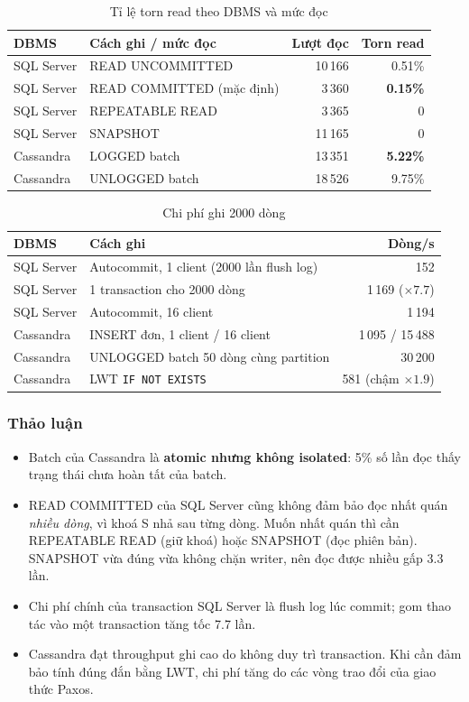 \begin{table}[H]
\centering
\caption{Tỉ lệ torn read theo DBMS và mức đọc}
\label{tab:torn-read}
\begin{tabular}{|l|l|r|r|}
\hline
\textbf{DBMS} & \textbf{Cách ghi / mức đọc} & \textbf{Lượt đọc} & \textbf{Torn read} \\ \hline
SQL Server & READ UNCOMMITTED & 10\,166 & 0.51\% \\ \hline
SQL Server & READ COMMITTED (mặc định) & 3\,360 & \textbf{0.15\%} \\ \hline
SQL Server & REPEATABLE READ & 3\,365 & 0 \\ \hline
SQL Server & SNAPSHOT & 11\,165 & 0 \\ \hline
Cassandra & LOGGED batch & 13\,351 & \textbf{5.22\%} \\ \hline
Cassandra & UNLOGGED batch & 18\,526 & 9.75\% \\ \hline
\end{tabular}
\end{table}

\begin{table}[H]
\centering
\caption{Chi phí ghi 2000 dòng}
\label{tab:tx-cost}
\begin{tabular}{|l|l|r|}
\hline
\textbf{DBMS} & \textbf{Cách ghi} & \textbf{Dòng/s} \\ \hline
SQL Server & Autocommit, 1 client (2000 lần flush log) & 152 \\ \hline
SQL Server & 1 transaction cho 2000 dòng & 1\,169 ($\times 7.7$) \\ \hline
SQL Server & Autocommit, 16 client & 1\,194 \\ \hline
Cassandra & INSERT đơn, 1 client / 16 client & 1\,095 / 15\,488 \\ \hline
Cassandra & UNLOGGED batch 50 dòng cùng partition & 30\,200 \\ \hline
Cassandra & LWT \texttt{IF NOT EXISTS} & 581 (chậm $\times 1.9$) \\ \hline
\end{tabular}
\end{table}

\subsubsection{Thảo luận}
\begin{itemize}
    \item Batch của Cassandra là \textbf{atomic nhưng không isolated}: 5\% số lần đọc thấy trạng thái chưa hoàn tất của batch.
    \item READ COMMITTED của SQL Server cũng không đảm bảo đọc nhất quán \textit{nhiều dòng}, vì khoá S nhả sau từng dòng. Muốn nhất quán thì cần REPEATABLE READ (giữ khoá) hoặc SNAPSHOT (đọc phiên bản). SNAPSHOT vừa đúng vừa không chặn writer, nên đọc được nhiều gấp 3.3 lần.
    \item Chi phí chính của transaction SQL Server là flush log lúc commit; gom thao tác vào một transaction tăng tốc 7.7 lần.
    \item Cassandra đạt throughput ghi cao do không duy trì transaction. Khi cần đảm bảo tính đúng đắn bằng LWT, chi phí tăng do các vòng trao đổi của giao thức Paxos.
\end{itemize}

